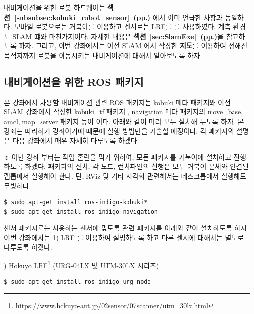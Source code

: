 내비게이션을 위한 로봇 하드웨어는 \textbf{섹션~\ref{subsubsec:kobuki_robot_sensor}~(pp.\pageref{subsubsec:kobuki_robot_sensor})} 에서 이미 언급한 사항과 동일하다. 모바일 로봇으로는 거북이를 이용하고 센서로는 LRF를 를 사용하였다. 계측 환경도 SLAM 떄와 마찬가지이다. 자세한 내용은 \textbf{섹션~\ref{sec:SlamExe}~(pp.\pageref{sec:SlamExe})}을 참고하도록 하자. 그리고, 이번 강좌에서는 이전 SLAM 에서 작성한 \textbf{지도}를 이용하여 정해진 목적지까지 로봇을 이동시키는 내비게이션에 대해서 알아보도록 하자.

\subsection{내비게이션을 위한 ROS 패키지}

본 강좌에서 사용할 내비게이션 관련 ROS 패키지는 kobuki 메타 패키지와 이전 SLAM 강좌에서 작성한 kobuki\_tf 패키지 , navigation 메타 패키지의 move\_base, amcl, map\_server 패키지 등이 이다. 아래와 같이 미리 모두 설치해 두도록 하자. 본 강좌는 따라하기 강좌이기에 때문에 실행 방법만을 기술할 예정이다. 각 패키지의 설명은 다음 강좌에서 매우 자세히 다루도록 하겠다. 

※ 이번 강좌 부터는 작업 혼란을 막기 위하여, 모든 패키지를 거북이에 설치하고 진행하도록 하겠다. 패키지의 설치, 각 노드, 런치파일의 실행은 모두 거북이 본체와 연결된 랩톱에서 실행해야 한다. 단, RViz 및 기타 시각화 관련해서는 데스크톱에서 실행해도 무방하다.

\vspace{\baselineskip}
\begin{lstlisting}[language=ROS]
$ sudo apt-get install ros-indigo-kobuki*
$ sudo apt-get install ros-indigo-navigation
\end{lstlisting}

센서 패키지로는 사용하는 센서에 맞도록 관련 패키지를 아래와 같이 설치하도록 하자. 이번 강좌에서는 1) LRF 를 이용하여 설명하도록 하고 다른 센서에 대해서는 별도로 다루도록 하겠다.

\setcounter{num}{0}

\vspace{\baselineskip}
\noindent
{}
\thenum) Hokuyo LRF\footnote{\url{https://www.hokuyo-aut.jp/02sensor/07scanner/utm_30lx.html}} (URG-04LX 및 UTM-30LX 시리즈)

\begin{lstlisting}[language=ROS]
$ sudo apt-get install ros-indigo-urg-node
\end{lstlisting}
 
